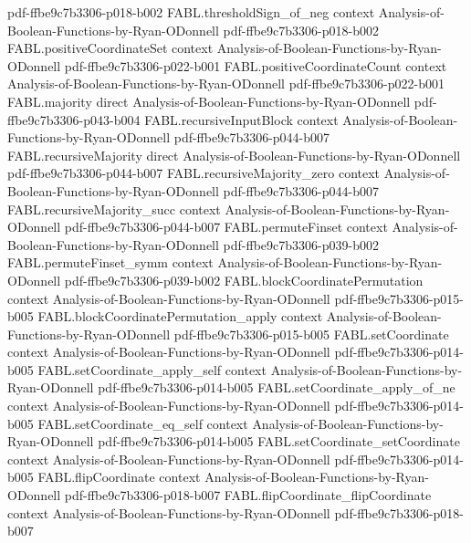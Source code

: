 \begin{theorem}
  {pdf-ffbe9c7b3306-p018-b002}
\proofstep
  {FABL.thresholdSign_of_neg}
  {context}
  {Analysis-of-Boolean-Functions-by-Ryan-ODonnell}
  {pdf-ffbe9c7b3306-p018-b002}
\proofstep
  {FABL.positiveCoordinateSet}
  {context}
  {Analysis-of-Boolean-Functions-by-Ryan-ODonnell}
  {pdf-ffbe9c7b3306-p022-b001}
\proofstep
  {FABL.positiveCoordinateCount}
  {context}
  {Analysis-of-Boolean-Functions-by-Ryan-ODonnell}
  {pdf-ffbe9c7b3306-p022-b001}
\proofstep
  {FABL.majority}
  {direct}
  {Analysis-of-Boolean-Functions-by-Ryan-ODonnell}
  {pdf-ffbe9c7b3306-p043-b004}
\proofstep
  {FABL.recursiveInputBlock}
  {context}
  {Analysis-of-Boolean-Functions-by-Ryan-ODonnell}
  {pdf-ffbe9c7b3306-p044-b007}
\proofstep
  {FABL.recursiveMajority}
  {direct}
  {Analysis-of-Boolean-Functions-by-Ryan-ODonnell}
  {pdf-ffbe9c7b3306-p044-b007}
\proofstep
  {FABL.recursiveMajority_zero}
  {context}
  {Analysis-of-Boolean-Functions-by-Ryan-ODonnell}
  {pdf-ffbe9c7b3306-p044-b007}
\proofstep
  {FABL.recursiveMajority_succ}
  {context}
  {Analysis-of-Boolean-Functions-by-Ryan-ODonnell}
  {pdf-ffbe9c7b3306-p044-b007}
\proofstep
  {FABL.permuteFinset}
  {context}
  {Analysis-of-Boolean-Functions-by-Ryan-ODonnell}
  {pdf-ffbe9c7b3306-p039-b002}
\proofstep
  {FABL.permuteFinset_symm}
  {context}
  {Analysis-of-Boolean-Functions-by-Ryan-ODonnell}
  {pdf-ffbe9c7b3306-p039-b002}
\proofstep
  {FABL.blockCoordinatePermutation}
  {context}
  {Analysis-of-Boolean-Functions-by-Ryan-ODonnell}
  {pdf-ffbe9c7b3306-p015-b005}
\proofstep
  {FABL.blockCoordinatePermutation_apply}
  {context}
  {Analysis-of-Boolean-Functions-by-Ryan-ODonnell}
  {pdf-ffbe9c7b3306-p015-b005}
\proofstep
  {FABL.setCoordinate}
  {context}
  {Analysis-of-Boolean-Functions-by-Ryan-ODonnell}
  {pdf-ffbe9c7b3306-p014-b005}
\proofstep
  {FABL.setCoordinate_apply_self}
  {context}
  {Analysis-of-Boolean-Functions-by-Ryan-ODonnell}
  {pdf-ffbe9c7b3306-p014-b005}
\proofstep
  {FABL.setCoordinate_apply_of_ne}
  {context}
  {Analysis-of-Boolean-Functions-by-Ryan-ODonnell}
  {pdf-ffbe9c7b3306-p014-b005}
\proofstep
  {FABL.setCoordinate_eq_self}
  {context}
  {Analysis-of-Boolean-Functions-by-Ryan-ODonnell}
  {pdf-ffbe9c7b3306-p014-b005}
\proofstep
  {FABL.setCoordinate_setCoordinate}
  {context}
  {Analysis-of-Boolean-Functions-by-Ryan-ODonnell}
  {pdf-ffbe9c7b3306-p014-b005}
\proofstep
  {FABL.flipCoordinate}
  {context}
  {Analysis-of-Boolean-Functions-by-Ryan-ODonnell}
  {pdf-ffbe9c7b3306-p018-b007}
\proofstep
  {FABL.flipCoordinate_flipCoordinate}
  {context}
  {Analysis-of-Boolean-Functions-by-Ryan-ODonnell}
  {pdf-ffbe9c7b3306-p018-b007}

\end{theorem}
